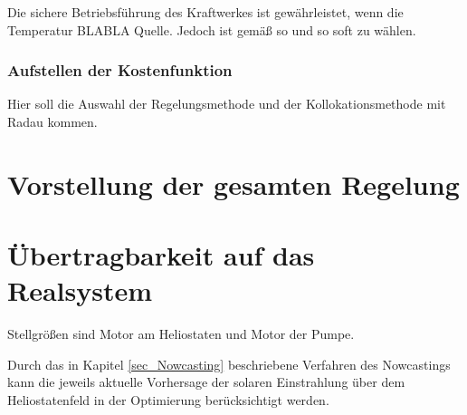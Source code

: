 Die sichere Betriebsführung des Kraftwerkes ist gewährleistet, wenn die Temperatur BLABLA Quelle.
Jedoch ist gemäß so und so soft zu wählen.


\subsubsection*{Aufstellen der Kostenfunktion} \label{subsubsec_Kostenfunktion}
Hier soll die Auswahl der Regelungsmethode und der Kollokationsmethode mit Radau kommen.

\section{Vorstellung der gesamten Regelung} \label{sec_VorstelungRegelung}

\section{Übertragbarkeit auf das Realsystem} \label{sec_RealsystemRegelung}

Stellgrößen sind Motor am Heliostaten und Motor der Pumpe.

Durch das in Kapitel \ref{sec_Nowcasting} beschriebene Verfahren des Nowcastings kann die jeweils aktuelle Vorhersage der solaren Einstrahlung über dem Heliostatenfeld in der Optimierung berücksichtigt werden.


